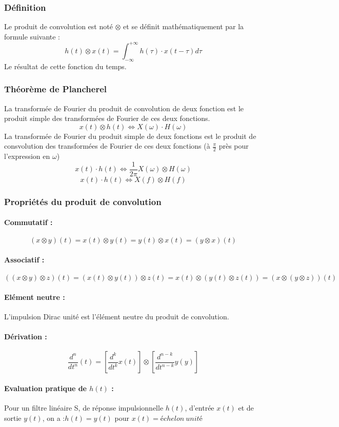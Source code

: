 \documentclass[10pt,a4paper,twoside]{article}
\begin{document}
\subsubsection{Définition}
Le produit de convolution est noté $\otimes$ et se définit mathématiquement par la formule suivante :
$$h(t)\otimes x(t)=\int_{-\infty}^{+\infty}h(\tau)\cdot x(t-\tau)d\tau$$
Le résultat de cette fonction du temps.

\subsubsection{Théorème de Plancherel}
La transformée de Fourier du produit de convolution de deux fonction est le produit simple des transformées de Fourier de ces deux fonctions.
$$x(t) \otimes h(t) \Leftrightarrow X(\omega)\cdot H(\omega)$$
La transformée de Fourier du produit simple de deux fonctions est le produit de consvolution des transformées de Fourier de ces deux fonctions (à $\frac{\pi}{2}$ près pour l'expression en $\omega$)
$$x(t)\cdot h(t) \Leftrightarrow \frac{1}{2\pi}X(\omega) \otimes H(\omega)$$
$$x(t)\cdot h(t) \Leftrightarrow X(f) \otimes H(f)$$

\subsubsection{Propriétés du produit de convolution}
\paragraph{Commutatif :}
$$(x\otimes y)(t)=x(t)\otimes y(t)=y(t)\otimes x(t)=(y\otimes x)(t)$$
\paragraph{Associatif :}
$$((x\otimes y)\otimes z)(t)=(x(t)\otimes y(t))\otimes z(t)=x(t)\otimes (y(t)\otimes z(t))=(x\otimes(y\otimes z))(t)$$
\paragraph{Elément neutre :} L'impulsion Dirac unité est l'élément neutre du produit de convolution.
\paragraph{Dérivation :}
$$\frac{d^{n}}{dt^{n}}(t)=[\frac{d^{k}}{dt^{k}}x(t)]\otimes [\frac{d^{n-k}}{dt^{n-k}}y(y)]$$

\paragraph{Evaluation pratique de $h(t)$ :} Pour un filtre linéaire S, de réponse impulsionnelle $h(t)$, d'entrée $x(t)$ et de sortie $y(t)$, on a :$h(t)=y(t)$ pour $x(t)=échelon\ unité$
\end{document}
